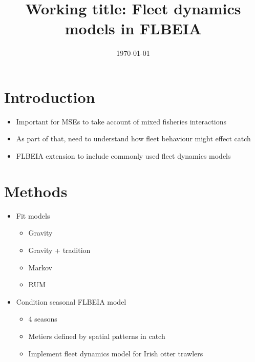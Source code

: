 \documentclass[12pt, halfline, a4paper]{ouparticle}
\begin{document}
\title{Working title: Fleet dynamics models in FLBEIA}

\author{
	\address{GMIT}
	\address{CEFAS}
	\and
	\address{GMIT}
	\and
	\address{AZTI}
}


\date{\today}


\maketitle

\section{Introduction}
\label{intro}

\begin{itemize}

	\item Important for MSEs to take account of mixed fisheries
		interactions
	\item As part of that, need to understand how fleet behaviour might
		effect catch
	\item FLBEIA extension to include commonly used fleet dynamics models	

\end{itemize}

\section{Methods}
\label{meth}

\begin{itemize}
	\item Fit models
		\begin{itemize}
			\item Gravity
			\item Gravity + tradition
			\item Markov
			\item RUM
		\end{itemize}
	\item Condition seasonal FLBEIA model
		\begin{itemize}
			\item 4 seasons
			\item Metiers defined by spatial patterns in catch
			\item Implement fleet dynamics model for Irish otter
				trawlers
		\end{itemize}
\end{itemize}
\end{document}
